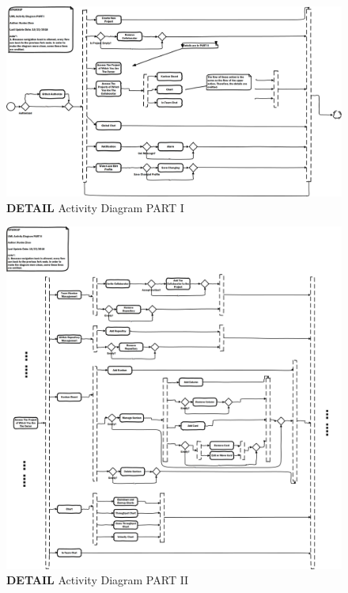 \documentclass[12pt,a4paper]{report}
\begin{document}
\begin{figure}[h]
	\centering
	\includegraphics[scale=0.5,angle=90]{./pics/ActivatyDiagramPARTI.png}
	\caption{\textbf{DETAIL} Activity Diagram PART I}
	\label{fig1}
\end{figure}

\begin{figure}[h]
	\centering
	\includegraphics[width=\textwidth]{./pics/ActivatyDiagramPARTII.png}
	\caption{\textbf{DETAIL} Activity Diagram PART II}
	\label{fig2}
\end{figure}
\end{document}
